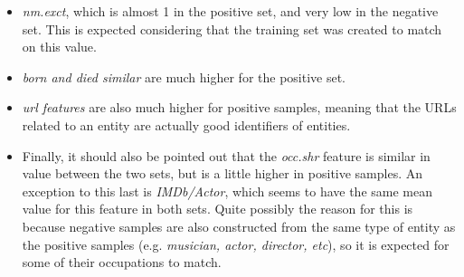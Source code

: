 \documentclass[epsfig,a4paper,11pt,titlepage,twoside,openany]{book}
\begin{document}
\begin{itemize}
    \item \textit{nm.exct}, which is almost 1 in the positive set, and very low in the negative set. This is expected considering that the training set was created to match on this value.
    
    \item \textit{born and died similar} are much higher for the positive set.
    
    \item \textit{url features} are also much higher for positive samples, meaning that the URLs related to an entity are actually good identifiers of entities.
    
    \item Finally, it should also be pointed out that the \textit{occ.shr} feature is similar in value between the two sets, but is a little higher in positive samples. An exception to this last is \textit{IMDb/Actor}, which seems to have the same mean value for this feature in both sets. Quite possibly the reason for this is because negative samples are also constructed from the same type of entity as the positive samples (e.g. \textit{musician, actor, director, etc}), so it is expected for some of their occupations to match. 
\end{itemize}
\end{document}
